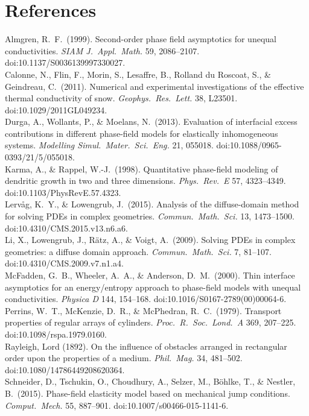 \documentclass[11pt]{article}
\begin{document}
\section*{References}
{\small
\noindent Almgren, R.\ F.\ (1999). Second-order phase field asymptotics for
unequal conductivities. \emph{SIAM J.\ Appl.\ Math.} 59, 2086--2107.
doi:10.1137/S0036139997330027.\\
Calonne, N., Flin, F., Morin, S., Lesaffre, B., Rolland du Roscoat, S., \&
Geindreau, C.\ (2011). Numerical and experimental investigations of the
effective thermal conductivity of snow. \emph{Geophys.\ Res.\ Lett.} 38,
L23501. doi:10.1029/2011GL049234.\\
Durga, A., Wollants, P., \& Moelans, N.\ (2013). Evaluation of interfacial
excess contributions in different phase-field models for elastically
inhomogeneous systems. \emph{Modelling Simul.\ Mater.\ Sci.\ Eng.} 21, 055018.
doi:10.1088/0965-0393/21/5/055018.\\
Karma, A., \& Rappel, W.-J.\ (1998). Quantitative phase-field modeling of
dendritic growth in two and three dimensions. \emph{Phys.\ Rev.\ E} 57,
4323--4349. doi:10.1103/PhysRevE.57.4323.\\
Lervåg, K.\ Y., \& Lowengrub, J.\ (2015). Analysis of the diffuse-domain
method for solving PDEs in complex geometries. \emph{Commun.\ Math.\ Sci.} 13,
1473--1500. doi:10.4310/CMS.2015.v13.n6.a6.\\
Li, X., Lowengrub, J., Rätz, A., \& Voigt, A.\ (2009). Solving PDEs in complex
geometries: a diffuse domain approach. \emph{Commun.\ Math.\ Sci.} 7, 81--107.
doi:10.4310/CMS.2009.v7.n1.a4.\\
McFadden, G.\ B., Wheeler, A.\ A., \& Anderson, D.\ M.\ (2000). Thin
interface asymptotics for an energy/entropy approach to phase-field models with
unequal conductivities. \emph{Physica D} 144, 154--168.
doi:10.1016/S0167-2789(00)00064-6.\\
Perrins, W.\ T., McKenzie, D.\ R., \& McPhedran, R.\ C.\ (1979). Transport
properties of regular arrays of cylinders. \emph{Proc.\ R.\ Soc.\ Lond.\ A}
369, 207--225. doi:10.1098/rspa.1979.0160.\\
Rayleigh, Lord (1892). On the influence of obstacles arranged in rectangular
order upon the properties of a medium. \emph{Phil.\ Mag.} 34, 481--502.
doi:10.1080/14786449208620364.\\
Schneider, D., Tschukin, O., Choudhury, A., Selzer, M., Böhlke, T., \&
Nestler, B.\ (2015). Phase-field elasticity model based on mechanical jump
conditions. \emph{Comput.\ Mech.} 55, 887--901. doi:10.1007/s00466-015-1141-6.
}
\end{document}
